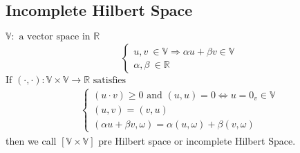 \documentclass[a4paper,12pt]{article}
\newcommand{\R}{\mathbb{R}}
\newcommand{\Vspace}{\mathbb{V}}
\begin{document}
\subsection{Incomplete Hilbert Space}
$\Vspace : \text{ a vector space in } \R$
\begin{equation}\nonumber
\begin{aligned}
\begin{cases}
u,v\ \in \Vspace \Rightarrow \alpha u + \beta v \in \Vspace\\
\alpha,\beta\ \in \R
\end{cases}
\end{aligned}
\end{equation}
$\text{If } (\cdot,\cdot) : \Vspace \times \Vspace \rightarrow \R \text{ satisfies}$
\begin{equation}\nonumber
\begin{aligned}
\begin{cases}
(u\cdot v) \geq 0 \text{ and } (u,u) = 0 \Leftrightarrow u = 0_v \in \Vspace\\
(u,v) = (v,u)\\
(\alpha u + \beta v, \omega) = \alpha(u,\omega) + \beta (v,\omega)
\end{cases}
\end{aligned}
\end{equation}
then we call $[\Vspace \times \Vspace]$ pre Hilbert space or incomplete Hilbert Space.
\end{document}
